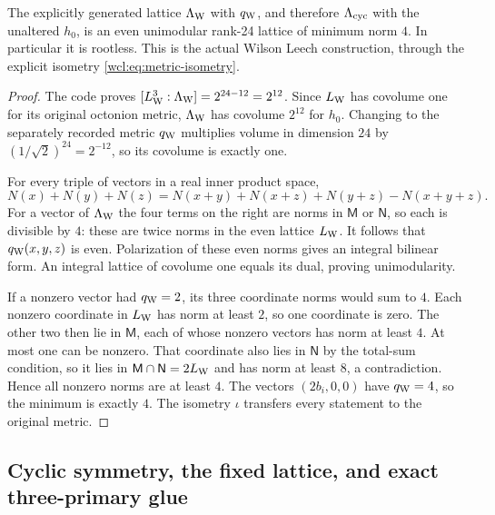 \begin{theorem}\label{wcl:thm:Leech}
The explicitly generated lattice $\Lambda_{\rm W}$ with $q_{\rm W}$,
and therefore $\Lambda_{\rm cyc}$ with the unaltered $h_0$, is an
even unimodular rank-24 lattice of minimum norm $4$. In particular
it is rootless. This is the actual Wilson Leech construction, through
the explicit isometry \eqref{wcl:eq:metric-isometry}.
\end{theorem}

\begin{proof}
The code proves
$[L_{\rm W}^3:\Lambda_{\rm W}]=2^{24-12}=2^{12}$.
Since $L_{\rm W}$ has covolume one for its original octonion metric,
$\Lambda_{\rm W}$ has covolume $2^{12}$ for $h_0$.
Changing to the separately recorded metric $q_{\rm W}$ multiplies
volume in dimension $24$ by $(1/\sqrt2)^{24}=2^{-12}$,
so its covolume is exactly one.

For every triple of vectors in a real inner product space,
\[
 N(x)+N(y)+N(z)
 =N(x+y)+N(x+z)+N(y+z)-N(x+y+z).
\]
For a vector of $\Lambda_{\rm W}$ the four terms on the right
are norms in $\mathsf M$ or $\mathsf N$, so each is divisible by
$4$: these are twice norms in the even lattice $L_{\rm W}$.
It follows that $q_{\rm W}(x,y,z)$ is even. Polarization of these
even norms gives an integral bilinear form. An integral lattice of
covolume one equals its dual, proving unimodularity.

If a nonzero vector had $q_{\rm W}=2$, its three coordinate norms
would sum to $4$. Each nonzero coordinate in $L_{\rm W}$ has norm
at least $2$, so one coordinate is zero. The other two then lie in
$\mathsf M$, each of whose nonzero vectors has norm at least $4$.
At most one can be nonzero. That coordinate also lies in $\mathsf N$
by the total-sum condition, so it lies in
$\mathsf M\cap\mathsf N=2L_{\rm W}$ and has norm at least $8$,
a contradiction. Hence all nonzero norms are at least $4$.
The vectors $(2b_i,0,0)$ have $q_{\rm W}=4$, so the minimum is
exactly $4$. The isometry $\iota$ transfers every statement to the
original metric.
\end{proof}

\subsection{Cyclic symmetry, the fixed lattice, and exact three-primary glue}

